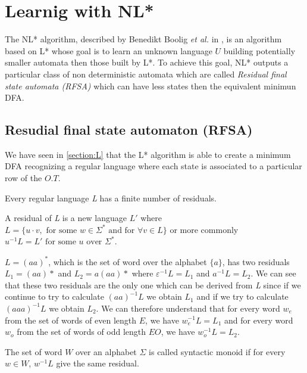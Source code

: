 \section{Learnig with NL* }

The NL* algorithm, described by Benedikt Boolig \textit{et al.} in \cite{NLPaper}, is an algorithm based on L* whose goal is to learn an unknown language $U$ building potentially smaller automata then those built by L*. To achieve this goal, NL* outputs a particular class of non deterministic automata which are called \textit{Residual final state automata (RFSA)} which can have less states then the equivalent minimun DFA.

\subsection{Resudial final state automaton (RFSA)}

We have seen in \cref{section:L} that the L* algorithm is able to create a minimum DFA recognizing a regular language where each state is associated to a particular row of the $O.T$.

\begin{theorem}
  Every regular language \textit{L} has a finite number of residuals.
\end{theorem}

A residual of \textit{L} is a new language $L'$ where $L = \{u \cdot v, \text{ for some } w \in \Sigma^* \text{ and for } \forall v \in L\}$ or more commonly $u^{-1} L = L' \text{ for some } u \text{ over } \Sigma^*$.

\begin{example}
  \label{example:residual}
  $L = (aa)^*$, which is the set of word over the alphabet $\{a\}$, has two residuals $L_1 = (aa)*$ and $L_2 = a(aa)*$ where ${\varepsilon}^{-1} L = L_1$ and $a^{-1}L = L_2$. We can see that these two residuals are the only one which can be derived from \textit{L} since if we continue to try to calculate $(aa)^{-1}L$ we obtain $L_1$ and if we try to calculate $(aaa)^{-1}L$ we obtain $L_2$. We can therefore understand that for every word $w_e$ from the set of words of even length $E$, we have $w_e^{-1}L = L_1$ and for every word $w_o$ from the set of words of odd length $EO$, we have $w_o^{-1}L = L_2$.
\end{example}

\begin{definition}
  \label{def:monoid}
  The set of word $W$ over an alphabet $\Sigma$ is called syntactic monoid if for every $w \in W$, $w^{-1}L$ give the same residual.
\end{definition}

